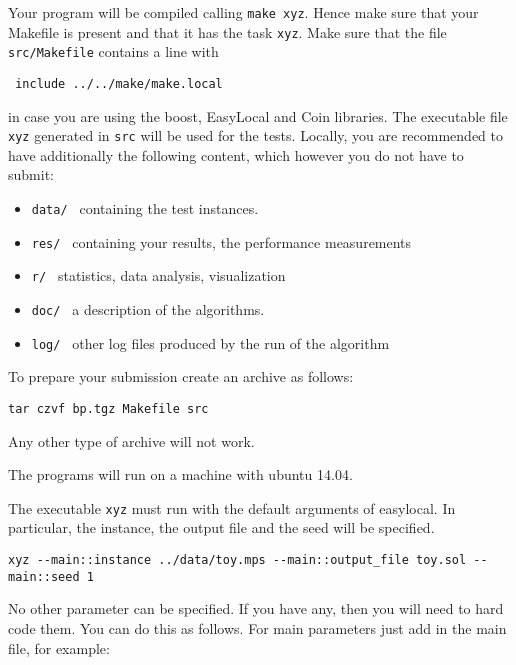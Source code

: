 Your program will be compiled calling \verb=make xyz=. Hence make sure
that your Makefile is present and that it has the task \verb=xyz=. 
Make sure that the file \texttt{src/Makefile} contains a line with   

\begin{verbatim}
 include ../../make/make.local
\end{verbatim}

in case you are using the boost, EasyLocal and Coin libraries.
The executable file \verb=xyz= generated in \verb=src= will be used for
the tests. Locally, you are recommended to have additionally the
following content, which however you do not have to submit:

\begin{itemize}
\item \texttt{data/ } containing the test instances.
\item \texttt{res/ } containing your results, the
  performance measurements
\item \texttt{r/ } statistics, data analysis, visualization
\item \texttt{doc/ } a description of the
  algorithms.
\item \texttt{log/ } other log files produced by the run of the
  algorithm
\end{itemize}


To prepare your submission create an archive as follows:
\begin{verbatim}
tar czvf bp.tgz Makefile src 
\end{verbatim}
Any other type of archive will not work.


The programs will run on a machine with ubuntu 14.04. 

\medskip

The executable \verb=xyz= must run with the default arguments of
easylocal. In particular, the instance, the output file and
the seed will be specified.

\begin{verbatim}
xyz --main::instance ../data/toy.mps --main::output_file toy.sol --main::seed 1
\end{verbatim}

No other parameter can be specified. If you have any, then you will need
to hard code them. You can do this as follows. For main parameters just
add in the main file, for example:


